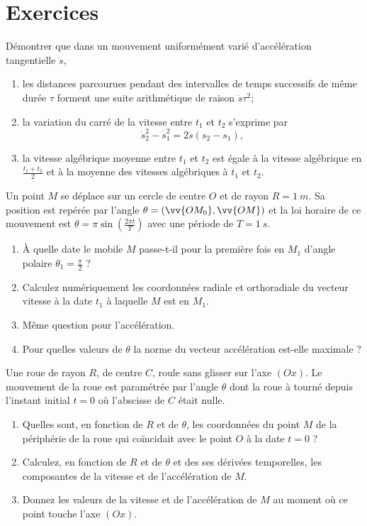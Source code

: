 \section{Exercices}
\label{chap1-sec:exercices}
\begin{exercice}
  Démontrer que dans un mouvement uniformément varié d'accélération tangentielle $\ddot{s}$,
  \begin{enumerate}
  \item les distances parcourues pendant des intervalles de temps successifs de même durée $\tau$ forment une suite arithmétique de raison $\ddot{s}\tau^2$;
  \item la variation du carré de la vitesse entre $t_1$ et $t_2$ s'exprime par
    \begin{equation}
      \dot{s}_2^2-\dot{s}_1^2 = 2 \ddot{s}(s_2-s_1),
    \end{equation}
  \item la vitesse algébrique moyenne entre $t_1$ et $t_2$ est égale à la vitesse algébrique en $\frac{t_1+t_2}{2}$ et à la moyenne des vitesses algébriques à $t_1$ et $t_2$.
  \end{enumerate}
\end{exercice}
%
\begin{exercice}
  Un point $M$ se déplace sur un cercle de centre $O$ et de rayon $R=\SI{1}{m}$. Sa position est repérée par l'angle $\theta=(\vv{OM_0},\vv{OM})$ et la loi horaire de ce mouvement est $\theta=\pi\sin\left(\frac{2\pi t}{T}\right)$ avec une période de $T=\SI{1}{s}$.
  \begin{enumerate}
  \item À quelle date le mobile $M$ passe-t-il pour la première fois en $M_1$ d'angle polaire $\theta_1=\frac{\pi}{2}$ ?
  \item Calculez numériquement les coordonnées radiale et orthoradiale du vecteur vitesse à la date $t_1$ à laquelle $M$ est en $M_1$.
  \item Même question pour l'accélération.
  \item Pour quelles valeurs de $\theta$ la norme du vecteur accélération est-elle maximale ?
  \end{enumerate}
\end{exercice}
%
\begin{exercice}
  Une roue de rayon $R$, de centre $C$, roule sans glisser sur l'axe $(Ox)$. Le mouvement de la roue est paramétrée par l'angle $\theta$ dont la roue à tourné depuis l'instant initial $t=0$ où l'abscisse de $C$ était nulle.
  \begin{enumerate}
  \item Quelles sont, en fonction de $R$ et de $\theta$, les coordonnées du point $M$ de la périphérie de la roue qui coïncidait avec le point $O$ à la date $t=0$ ?
  \item Calculez, en fonction de $R$ et de $\theta$ et des ses dérivées temporelles, les composantes de la vitesse et de l'accélération de $M$.
  \item Donnez les valeurs de la vitesse et de l'accélération de $M$ au moment où ce point touche l'axe $(Ox)$.
  \end{enumerate}
\end{exercice}
